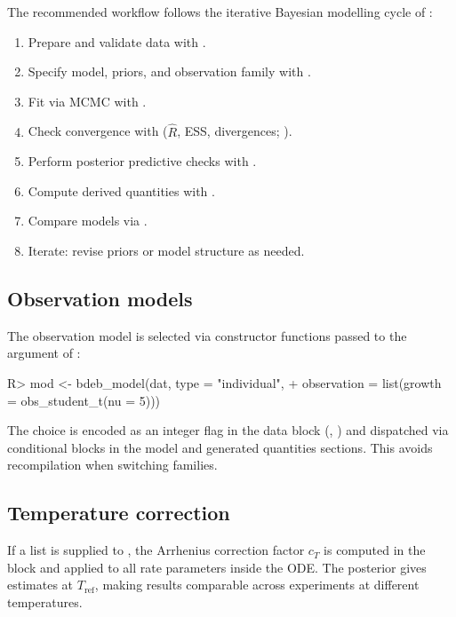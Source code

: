 \documentclass[article,shortnames]{jss}
\begin{document}
The recommended workflow follows the iterative Bayesian modelling cycle
of \citet[Ch.~6]{GelmanBDA2013}:
\begin{enumerate}
  \item Prepare and validate data with .
  \item Specify model, priors, and observation family with
    .
  \item Fit via MCMC with .
  \item Check convergence with 
    ($\hat{R}$, ESS, divergences; \citealp{VehtariRhat2021}).
  \item Perform posterior predictive checks with .
  \item Compute derived quantities with .
  \item Compare models via 
    \citep{VehtariLOO2017}.
  \item Iterate: revise priors or model structure as needed.
\end{enumerate}

\subsection{Observation models} \label{sec:obs}

The observation model is selected via constructor functions passed to
the  argument of :
\begin{CodeChunk}
\begin{CodeInput}
R> mod <- bdeb_model(dat, type = "individual",
+    observation = list(growth = obs_student_t(nu = 5)))
\end{CodeInput}
\end{CodeChunk}
The choice is encoded as an integer flag in the  data
block (, ) and
dispatched via conditional blocks in the model and generated quantities
sections.  This avoids recompilation when switching families.

\subsection{Temperature correction} \label{sec:temp_impl}

If a  list is supplied to , the
Arrhenius correction factor $c_T$ is computed in the 
 block and applied to all rate parameters inside
the ODE.  The posterior gives estimates at $T_{\mathrm{ref}}$, making
results comparable across experiments at different temperatures.
\end{document}

